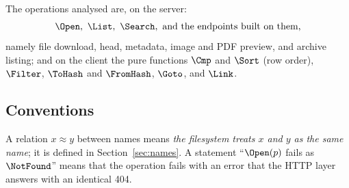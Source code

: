 The operations analysed are, on the server:
\[
  \Open,\ \List,\ \Search,\ \text{and the endpoints built on them,}
\]
namely file download, head, metadata, image and PDF preview, and archive
listing; and on the client the pure functions $\Cmp$ and $\Sort$ (row order),
$\Filter$, $\ToHash$ and $\FromHash$, $\Goto$, and $\Link$.

\subsection{Conventions}

A relation $x\approx y$ between names means \emph{the filesystem treats $x$ and
$y$ as the same name}; it is defined in Section~\ref{sec:names}.  A statement
``$\Open(p)$ fails as $\NotFound$'' means that the operation fails with an error
that the HTTP layer answers with an identical 404.
